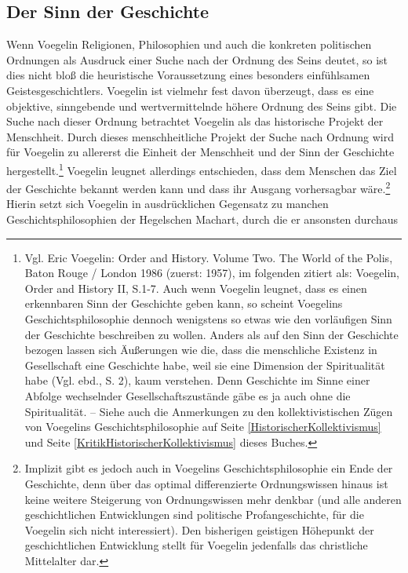 \subsection{Der Sinn der Geschichte}

Wenn Voegelin Religionen, Philosophien und auch die konkreten politischen
Ordnungen als Ausdruck einer Suche nach der Ordnung des Seins deutet, so ist
dies nicht bloß die heuristische Voraussetzung eines besonders einfühlsamen
Geistesgeschichtlers. Voegelin ist vielmehr fest davon überzeugt, dass es eine
objektive, sinngebende und wertvermittelnde höhere Ordnung des Seins gibt. Die
Suche nach dieser Ordnung betrachtet Voegelin als das historische Projekt der
Menschheit. Durch dieses menschheitliche Projekt der Suche nach Ordnung wird
für Voegelin zu allererst die Einheit der Menschheit und der Sinn der
Geschichte hergestellt.\footnote{Vgl. Eric Voegelin: Order and History.
  Volume Two. The World of the Polis, Baton Rouge / London 1986 (zuerst:
  1957), im folgenden zitiert als: Voegelin, Order and History II, S.1-7. Auch
  wenn Voegelin leugnet, dass es einen erkennbaren Sinn der Geschichte geben
  kann, so scheint Voegelins Geschichtsphilosophie dennoch wenigstens so etwas
  wie den vorläufigen Sinn der Geschichte beschreiben zu wollen. Anders als
  auf den Sinn der Geschichte bezogen lassen sich Äußerungen wie die, dass die
  menschliche Existenz in Gesellschaft eine Geschichte habe, weil sie eine
  Dimension der Spiritualität habe (Vgl. ebd., S. 2), kaum verstehen. Denn
  Geschichte im Sinne einer Abfolge wechselnder Gesellschaftszustände gäbe es
  ja auch ohne die Spiritualität. -- Siehe auch die Anmerkungen zu den
  kollektivistischen Zügen von Voegelins Geschichtsphilosophie auf Seite
  \ref{HistorischerKollektivismus} und Seite
  \ref{KritikHistorischerKollektivismus} dieses Buches.}  Voegelin leugnet
allerdings entschieden, dass dem Menschen das Ziel der Geschichte bekannt
werden kann und dass ihr Ausgang vorhersagbar wäre.\footnote{Implizit gibt es
  jedoch auch in Voegelins Geschichtsphilosophie ein Ende der Geschichte, denn
  über das optimal differenzierte Ordnungswissen hinaus ist keine weitere
  Steigerung von Ordnungswissen mehr denkbar (und alle anderen geschichtlichen
  Entwicklungen sind politische Profangeschichte, für die Voegelin sich nicht
  interessiert).  Den bisherigen geistigen Höhepunkt der geschichtlichen
  Entwicklung stellt für Voegelin jedenfalls das christliche Mittelalter dar.}
Hierin setzt sich Voegelin in ausdrücklichen Gegensatz zu manchen
Geschichtsphilosophien der Hegelschen Machart, durch die er ansonsten durchaus
